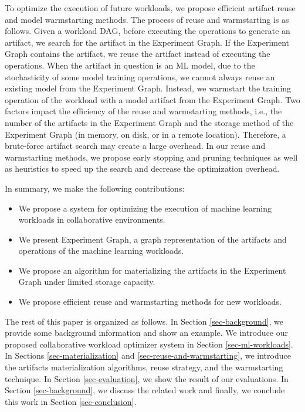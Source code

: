 To optimize the execution of future workloads, we propose efficient artifact reuse and model warmstarting methods.
The process of reuse and warmstarting is as follows.
Given a workload DAG, before executing the operations to generate an artifact, we search for the artifact in the Experiment Graph.
If the Experiment Graph contains the artifact, we reuse the artifact instead of executing the operations.
When the artifact in question is an ML model, due to the stochasticity of some model training operations, we cannot always reuse an existing model from the Experiment Graph.
Instead, we warmstart the training operation of the workload with a model artifact from the Experiment Graph.
Two factors impact the efficiency of the reuse and warmstarting methods, i.e., the number of the artifacts in the Experiment Graph and the storage method of the Experiment Graph (in memory, on disk, or in a remote location).
Therefore, a brute-force artifact search may create a large overhead.
In our reuse and warmstarting methods, we propose early stopping and pruning techniques as well as heuristics to speed up the search and decrease the optimization overhead.

In summary, we make the following contributions:
\begin{itemize}
\item We propose a system for optimizing the execution of machine learning workloads in collaborative environments.
\item We present Experiment Graph, a graph representation of the artifacts and operations of the machine learning workloads.
\item We propose an algorithm for materializing the artifacts in the Experiment Graph under limited storage capacity.
\item We propose efficient reuse and warmstarting methods for new workloads.
\end{itemize}

The rest of this paper is organized as follows.
In Section \ref{sec-background}, we provide some background information and show an example.
We introduce our proposed collaborative workload optimizer system in Section \ref{sec-ml-workloads}.
In Sections \ref{sec-materialization} and \ref{sec-reuse-and-warmstarting}, we introduce the artifacts materialization algorithms, reuse strategy, and the warmstarting technique. 
In Section \ref{sec-evaluation}, we show the result of our evaluations.
In Section \ref{sec-background}, we discuss the related work and finally, we conclude this work in Section \ref{sec-conclusion}.